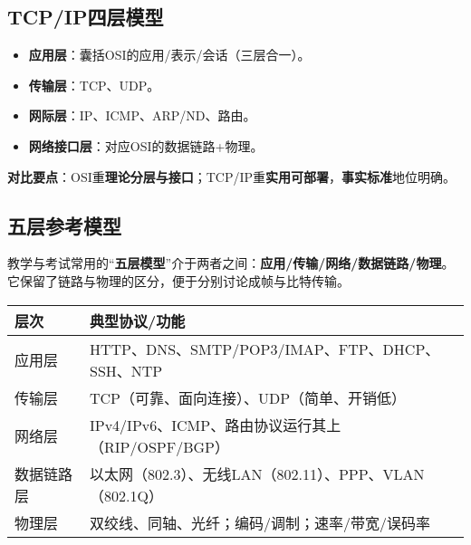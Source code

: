 \documentclass[lang=cn,newtx,10pt,scheme=chinese]{../../elegantbook}
\begin{document}
\subsection{TCP/IP四层模型}

\begin{itemize}
    \item \textbf{应用层}：囊括OSI的应用/表示/会话（三层合一）。
    \item \textbf{传输层}：TCP、UDP。
    \item \textbf{网际层}：IP、ICMP、ARP/ND、路由。
    \item \textbf{网络接口层}：对应OSI的数据链路+物理。
\end{itemize}

\begin{center}
\end{center}

	\textbf{对比要点}：OSI重\textbf{理论分层与接口}；TCP/IP重\textbf{实用可部署}，\textbf{事实标准}地位明确。

\subsection{五层参考模型}

教学与考试常用的“\textbf{五层模型}”介于两者之间：\textbf{应用/传输/网络/数据链路/物理}。它保留了链路与物理的区分，便于分别讨论成帧与比特传输。

\begin{longtable}{|p{3cm}|p{10.5cm}|}
\hline
	\textbf{层次} & \textbf{典型协议/功能} \\
\hline
应用层 & HTTP、DNS、SMTP/POP3/IMAP、FTP、DHCP、SSH、NTP \\
\hline
传输层 & TCP（可靠、面向连接）、UDP（简单、开销低） \\
\hline
网络层 & IPv4/IPv6、ICMP、路由协议运行其上（RIP/OSPF/BGP） \\
\hline
数据链路层 & 以太网（802.3）、无线LAN（802.11）、PPP、VLAN（802.1Q） \\
\hline
物理层 & 双绞线、同轴、光纤；编码/调制；速率/带宽/误码率 \\
\hline
\end{longtable}
\end{document}
